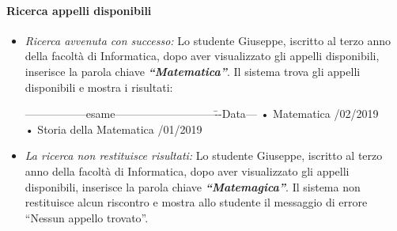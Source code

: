 \paragraph{Ricerca appelli disponibili}
\begin{itemize}
	\item \textit{Ricerca avvenuta con successo:}
	Lo studente Giuseppe, iscritto al terzo anno della facoltà di Informatica, dopo aver visualizzato gli appelli disponibili, inserisce la parola chiave \textbf{\textit{“Matematica”}}. Il sistema trova gli appelli disponibili e mostra i risultati:
	\begin{tabbing}
		\hspace{1cm}-----------------esame---------------------------\=--Data---\kill
		\hspace{1cm} • Matematica  /02/2019  \\
		\hspace{1cm} • Storia della Matematica /01/2019 \\
	\end{tabbing}
	
	\item \textit{La ricerca non restituisce risultati:}
	Lo studente Giuseppe, iscritto al terzo anno della facoltà di Informatica, dopo aver visualizzato gli appelli disponibili, inserisce la parola chiave \textbf{\textit{“Matemagica”}}. Il sistema non restituisce alcun riscontro e mostra allo studente il messaggio di errore “Nessun appello trovato”.
\end{itemize}

